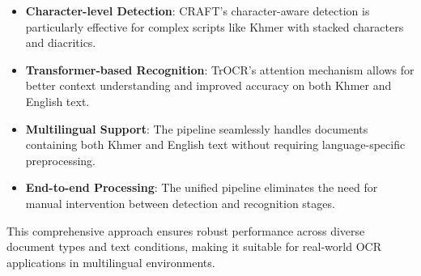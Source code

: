 {\begin{itemize}
\item \textbf{Character-level Detection}: CRAFT's character-aware detection is particularly effective for complex scripts like Khmer with stacked characters and diacritics.

\item \textbf{Transformer-based Recognition}: TrOCR's attention mechanism allows for better context understanding and improved accuracy on both Khmer and English text.

\item \textbf{Multilingual Support}: The pipeline seamlessly handles documents containing both Khmer and English text without requiring language-specific preprocessing.

\item \textbf{End-to-end Processing}: The unified pipeline eliminates the need for manual intervention between detection and recognition stages.
\end{itemize}

This comprehensive approach ensures robust performance across diverse document types and text conditions, making it suitable for real-world OCR applications in multilingual environments.

}